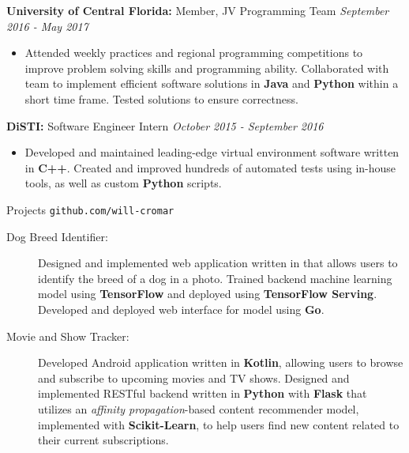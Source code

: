 \documentclass[letterpaper,11pt,oneside]{article}
\newcommand{\resheader}[2][]{
  \vspace{9pt}
  {\LARGE #2} #1
  \\
}
\newcommand{\ressubheader}[3][]{
  \vspace{6pt}
  {\textbf{#2} #1} \hfill \emph{#3}
  \\
}
\newcommand{\resskill}[1]{\textbf{#1}}
\begin{document}
\ressubheader[Member, JV Programming Team]{University of Central Florida:}{September 2016 - May 2017}
\begin{itemize}
  \item Attended weekly practices and regional programming competitions to improve problem solving skills and programming ability. Collaborated with team to implement efficient software solutions in \resskill{Java} and \resskill{Python} within a short time frame. Tested solutions to ensure correctness.
\end{itemize}

\ressubheader[Software Engineer Intern]{DiSTI:}{October 2015 - September 2016}
\begin{itemize}
  \item Developed and maintained leading-edge virtual environment software written in \resskill{C++}. Created and improved hundreds of automated tests using in-house tools, as well as custom \resskill{Python} scripts.
\end{itemize}

\resheader[\hfill \texttt{github.com/will-cromar}]{Projects}
\begin{description}
  \item [Dog Breed Identifier:] Designed and implemented web application written in that allows users to identify the breed of a dog in a photo. Trained backend machine learning model using \resskill{TensorFlow} and deployed using \resskill{TensorFlow Serving}. Developed and deployed web interface for model using \resskill{Go}.
  \item [Movie and Show Tracker:] Developed Android application written in \resskill{Kotlin}, allowing users to browse and subscribe to upcoming movies and TV shows. Designed and implemented RESTful backend written in \resskill{Python} with \resskill{Flask} that utilizes an \emph{affinity propagation}-based content recommender model, implemented with \resskill{Scikit-Learn}, to help users find new content related to their current subscriptions.
\end{description}    
\end{document}
